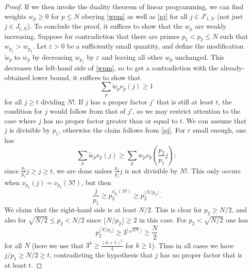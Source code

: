 \documentclass[10pt,a4paper,reqno]{amsart}
\numberwithin{equation}{section}
\theoremstyle{plain}
\theoremstyle{definition}
\newcommand\eps{\varepsilon}
\begin{document}
\begin{proof}
If we then invoke the duality theorem of linear programming, we can find weights $w_p \geq 0$ for $p \leq N$ obeying \eqref{wpm} as well as \eqref{pj} for all $j \in J'_{t,N}$ (not just $j \in J_{t,N}$).  To conclude the proof, it suffices to show that the $w_p$ are weakly increasing. Suppose for contradiction that there are primes $p_1 < p_2 \leq N$ such that $w_{p_1} > w_{p_2}$.  Let $\eps>0$ be a sufficiently small quantity, and define the modification $\tilde w_p$ to $w_p$ by decreasing $w_{p_1}$ by $\eps$ and leaving all other $w_p$ unchanged.  This decreases the left-hand side of \eqref{wpm}, so to get a contradiction with the already-obtained lower bound, it suffices to show that
  $$ \sum_p \tilde w_p \nu_p(j) \geq 1$$
  for all $j \geq t$ dividing $N!$.  If $j$ has a proper factor $j'$ that is still at least $t$, the condition for $j$ would follow from that of $j'$, so we may restrict attention to the case where $j$ has no proper factor greater than or equal to $t$.  We can assume that $j$ is divisible by $p_1$, otherwise the claim follows from \eqref{pj}.  For $\eps$ small enough, one has
  $$ \sum_p \tilde w_p \nu_p(j) \geq \sum_p w_p \nu_p\left(\frac{p_2}{p_1} j\right);$$
since $\frac{p_2}{p_1} j \geq j \geq t$, we are done unless $\frac{p_2}{p_1} j$ is not divisible by $N!$. This only occurs when $\nu_{p_2}(j) = \nu_{p_2}(N!)$, but then
$$ \frac{j}{p_1} \geq p_2^{\nu_{p_2}(N!)} \geq p_2^{\lfloor N/p_2\rfloor}.$$
We claim that the right-hand side is at least $N/2$.  This is clear for $p_2 \geq N/2$, and also for $\sqrt{N/2} \leq p_2 < N/2$ since $\lfloor N/p_2\rfloor \geq 2$ in this case.  For $p_2 < \sqrt{N/2}$ one has
$$  p_2^{\lfloor N/p_2\rfloor} \geq 3^{\lfloor \sqrt{2N} \rfloor} \geq \frac{N}{2}$$
for all $N$ (here we use that $3^k \geq \frac{(k+1)^2}{4}$ for $k \geq 1$).  Thus in all cases we have $j/p_1 \geq N/2 \geq t$, contradicting the hypothesis that $j$ has no proper factor that is at least $t$.
\end{proof}
\end{document}
